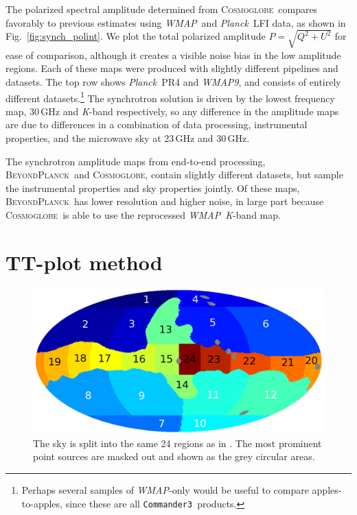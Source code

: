\documentclass[twocolumn]{../../common/aa}
\def\WMAP{\emph{WMAP}}
\def\WMAPnine{\emph{WMAP9}}
\def\Planck{\emph{Planck}}
\def\commanderthree{\texttt{Commander3}}
\newcommand{\bp}{\textsc{BeyondPlanck}}
\newcommand{\cosmoglobe}{\textsc{Cosmoglobe}}
\newcommand{\K}[0]{\textit K}
\begin{document}
The polarized spectral amplitude determined from \cosmoglobe\ compares favorably to previous estimates using \WMAP\ and \Planck\ LFI data, as shown in Fig.~\ref{fig:synch_polint}. We plot the total polarized amplitude $P=\sqrt{Q^2+U^2}$ for ease of comparison, although it creates a visible noise bias in the low amplitude regions. Each of these maps were produced with slightly different pipelines and datasets. The top row shows \Planck\ PR4 and \WMAPnine, and consists of entirely different datasets.\footnote{Perhaps several samples of \WMAP-only would be useful to compare apples-to-apples, since these are all \commanderthree\ products.} The synchrotron solution is driven by the lowest frequency map, 30\,GHz and \K-band respectively, so any difference in the amplitude maps are due to differences in a combination of data processing, instrumental properties, and the microwave sky at 23\,GHz and 30\,GHz.

The synchrotron amplitude maps from end-to-end processing, \bp\ and \cosmoglobe, contain slightly different datasets, but sample the instrumental properties and sky properties jointly. Of these maps, \bp\ has lower resolution and higher noise, in large part because \cosmoglobe\ is able to use the reprocessed \WMAP\ \K-band map.



\section{TT-plot method}
\label{sec:methods}



\begin{figure}
        \centering
        \includegraphics[width=\linewidth]{figures/utnymaske_tall_converted.pdf}
        \caption{The sky is split into the same 24 regions as in \citet{fuskeland2014}. The most prominent point sources are masked out and shown as the grey circular areas.
        }
        \label{fig:regions}
\end{figure}
\end{document}
